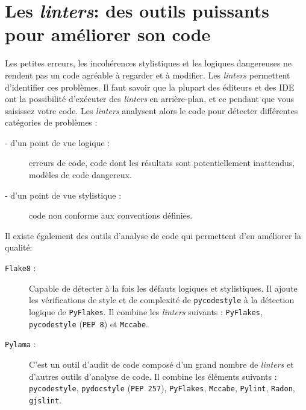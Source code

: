 \documentclass[a4paper,11pt]{book}
\begin{document}
\section{Les \textit{linters}: des outils puissants pour améliorer son code}
Les petites erreurs, les incohérences stylistiques et les logiques dangereuses ne rendent pas un code agréable à regarder et à modifier. Les \textit{linters} permettent d'identifier ces problèmes. Il faut savoir que la plupart des éditeurs et des IDE ont la possibilité d'exécuter des \textit{linters} en arrière-plan, et ce  pendant que vous saisissez votre code. Les \textit{linters} analysent alors le code pour détecter différentes catégories de problèmes :
\begin{description}
	\item[- d'un point de vue logique :] erreurs de code, code dont les résultats sont potentiellement inattendus, modèles de code dangereux.
	\item[- d'un point de vue stylistique :] code non conforme aux conventions définies.
\end{description}
\medskip

Il existe également des outils d'analyse de code qui permettent d’en améliorer la qualité:
\begin{description}
	\item[\texttt{Flake8} :] Capable de détecter à la fois les défauts logiques et stylistiques. Il ajoute les vérifications de style et de complexité de \texttt{pycodestyle} à la détection logique de \texttt{PyFlakes}. Il combine les \textit{linters} suivants : \texttt{PyFlakes}, \texttt{pycodestyle} (\texttt{PEP 8}) et \texttt{Mccabe}.
	\item[\texttt{Pylama} :] C'est un outil d'audit de code composé d'un grand nombre de \textit{linters} et d'autres outils d'analyse de code. Il combine les éléments suivants : \texttt{pycodestyle}, \texttt{pydocstyle} (\texttt{PEP 257}), \texttt{PyFlakes}, \texttt{Mccabe}, \texttt{Pylint}, \texttt{Radon}, \texttt{gjslint}.
\end{description}
\medskip
\end{document}
